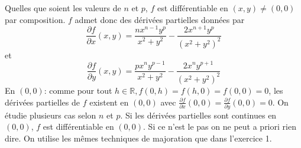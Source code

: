 \documentclass{report}
\begin{document}
\subsection{} \noindent{}\\ 
\\ 
\\
\noindent Quelles que soient les valeurs de $n$ et $p$, $f$ est différentiable en $(x,y)\neq (0,0)$ par composition. $f$ admet donc des dérivées partielles données par $$\frac{\partial f}{\partial x}(x,y) = \frac{n x^{n-1} y^p}{x^2+y^2}-\frac{2 x^{n+1} y^p}{\left(x^2+y^2\right)^2}$$ et $$\frac{\partial f}{\partial y}(x,y)=\frac{p x^n y^{p-1}}{x^2+y^2}-\frac{2 x^n y^{p+1}}{\left(x^2+y^2\right)^2}$$ \newline
En $(0,0)$: comme pour tout $h\in \mathbb R, f(0,h)=f(h,0)=f(0,0)=0$, les dérivées partielles de $f$ existent en $(0,0)$ avec $\frac{\partial f}{\partial x}(0,0)=\frac{\partial f}{\partial y}(0,0)=0$.\newline \newline 
On étudie plusieurs cas selon $n$ et $p$. Si les dérivées partielles sont continues en $(0,0)$, $f$ est différentiable en $(0,0)$. Si ce n'est le pas on ne peut a priori rien dire.\newline
On utilise les mêmes techniques de majoration que dans l'exercice 1.
\end{document}
